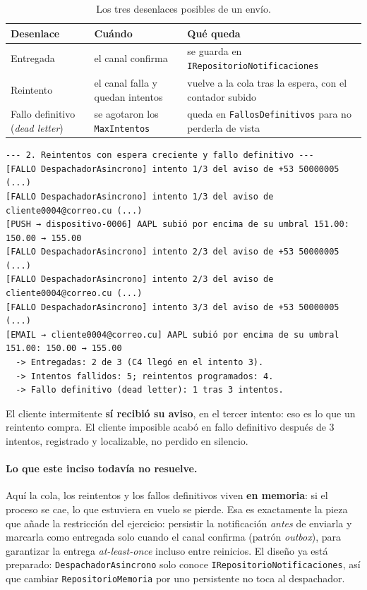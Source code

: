\begin{table}[H]
\centering
\small
\begin{tabularx}{\textwidth}{>{\raggedright\arraybackslash}p{3.5cm} >{\raggedright\arraybackslash}p{5.2cm} >{\raggedright\arraybackslash}X}
\toprule
\textbf{Desenlace} & \textbf{Cuándo} & \textbf{Qué queda} \\
\midrule
Entregada & el canal confirma & se guarda en \texttt{IRepositorioNotificaciones} \\
Reintento & el canal falla y quedan intentos & vuelve a la cola tras la espera, con el contador subido \\
Fallo definitivo (\emph{dead letter}) & se agotaron los \texttt{MaxIntentos} & queda en \texttt{FallosDefinitivos} para no perderla de vista \\
\bottomrule
\end{tabularx}
\caption{Los tres desenlaces posibles de un envío.}
\end{table}

\begin{lstlisting}[language={}, numbers=none, basicstyle=\ttfamily\scriptsize, columns=fullflexible, keepspaces=true, caption={Un proveedor que se recupera, uno que no responde nunca y uno normal.}]
--- 2. Reintentos con espera creciente y fallo definitivo ---
[FALLO DespachadorAsincrono] intento 1/3 del aviso de +53 50000005 (...)
[FALLO DespachadorAsincrono] intento 1/3 del aviso de cliente0004@correo.cu (...)
[PUSH → dispositivo-0006] AAPL subió por encima de su umbral 151.00: 150.00 → 155.00
[FALLO DespachadorAsincrono] intento 2/3 del aviso de +53 50000005 (...)
[FALLO DespachadorAsincrono] intento 2/3 del aviso de cliente0004@correo.cu (...)
[FALLO DespachadorAsincrono] intento 3/3 del aviso de +53 50000005 (...)
[EMAIL → cliente0004@correo.cu] AAPL subió por encima de su umbral 151.00: 150.00 → 155.00
  -> Entregadas: 2 de 3 (C4 llegó en el intento 3).
  -> Intentos fallidos: 5; reintentos programados: 4.
  -> Fallo definitivo (dead letter): 1 tras 3 intentos.
\end{lstlisting}

El cliente intermitente \textbf{sí recibió su aviso}, en el tercer intento: eso es lo que un
reintento compra. El cliente imposible acabó en fallo definitivo después de 3 intentos,
registrado y localizable, no perdido en silencio.

\paragraph{Lo que este inciso todavía no resuelve.}
Aquí la cola, los reintentos y los fallos definitivos viven \textbf{en memoria}: si el
proceso se cae, lo que estuviera en vuelo se pierde. Esa es exactamente la pieza que añade
la restricción del ejercicio: persistir la notificación \emph{antes} de enviarla y marcarla
como entregada solo cuando el canal confirma (patrón \emph{outbox}), para garantizar la
entrega \emph{at-least-once} incluso entre reinicios. El diseño ya está preparado:
\texttt{DespachadorAsincrono} solo conoce \texttt{IRepositorioNotificaciones}, así que
cambiar \texttt{RepositorioMemoria} por uno persistente no toca al despachador.

